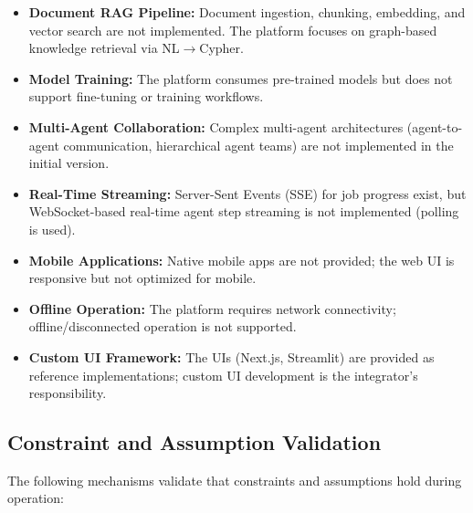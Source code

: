 \documentclass[a4paper,twoside]{sapthesis}
\begin{document}
\begin{itemize}
    \item \textbf{Document RAG Pipeline:} Document ingestion, chunking, embedding, and vector search are not implemented. The platform focuses on graph-based knowledge retrieval via NL$\rightarrow$Cypher.
    
    \item \textbf{Model Training:} The platform consumes pre-trained models but does not support fine-tuning or training workflows.
    
    \item \textbf{Multi-Agent Collaboration:} Complex multi-agent architectures (agent-to-agent communication, hierarchical agent teams) are not implemented in the initial version.
    
    \item \textbf{Real-Time Streaming:} Server-Sent Events (SSE) for job progress exist, but WebSocket-based real-time agent step streaming is not implemented (polling is used).
    
    \item \textbf{Mobile Applications:} Native mobile apps are not provided; the web UI is responsive but not optimized for mobile.
    
    \item \textbf{Offline Operation:} The platform requires network connectivity; offline/disconnected operation is not supported.
    
    \item \textbf{Custom UI Framework:} The UIs (Next.js, Streamlit) are provided as reference implementations; custom UI development is the integrator's responsibility.
\end{itemize}

\subsection{Constraint and Assumption Validation}
\label{subsec:constraint-validation}

The following mechanisms validate that constraints and assumptions hold during operation:
\end{document}
